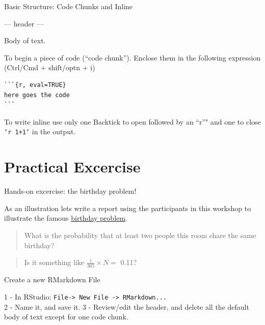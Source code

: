 \documentclass[ignorenonframetext,]{beamer}
\newenvironment{Shaded}{\begin{snugshade}}{\end{snugshade}}
\newcommand{\NormalTok}[1]{{#1}}
\begin{document}
\begin{frame}[fragile]{Basic Structure: Code Chunks and Inline}

\begin{Shaded}
\begin{Highlighting}[]
\NormalTok{---}
\NormalTok{header}
\NormalTok{---}
\end{Highlighting}
\end{Shaded}

Body of text.

To begin a piece of code (``code chunk''). Enclose them in the following
expression (Ctrl/Cmd + shift/optn + i)

\begin{verbatim}
```{r, eval=TRUE}
here goes the code
```
\end{verbatim}

To write inline use only one Backtick to open followed by an ``r''" and
one to close \texttt{`r\ 1+1`} in the output.

\end{frame}

\section{Practical Excercise}\label{practical-excercise}

\begin{frame}{Hands-on excercise: the birthday problem!}

As an illustration lets write a report using the participants in this
workshop to illustrate the famous
\href{https://en.wikipedia.org/wiki/Birthday_problem}{birthday problem}.

\begin{quote}
What is the probability that at least two people this room share the
same birthday?
\end{quote}

\begin{quote}
Is it something like \(\frac{1}{365} \times N =\) 0.11?
\end{quote}

\end{frame}

\begin{frame}[fragile]{Create a new RMarkdown File}

1 - In RStudio:
\texttt{File-\textgreater{}\ New\ File\ -\textgreater{}\ RMarkdown...}\\
2 - Name it, and save it. 3 - Review/edit the header, and delete all the
default body of text except for one code chunk.

\end{frame}
\end{document}
